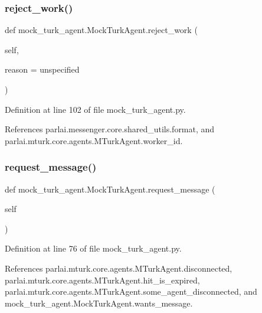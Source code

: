 \subsubsection{\texorpdfstring{reject\+\_\+work()}{reject\_work()}}
{\footnotesize\ttfamily def mock\+\_\+turk\+\_\+agent.\+Mock\+Turk\+Agent.\+reject\+\_\+work (\begin{DoxyParamCaption}\item[{}]{self,  }\item[{}]{reason = {\ttfamily \textquotesingle{}unspecified\textquotesingle{}} }\end{DoxyParamCaption})}



Definition at line 102 of file mock\+\_\+turk\+\_\+agent.\+py.



References parlai.\+messenger.\+core.\+shared\+\_\+utils.\+format, and parlai.\+mturk.\+core.\+agents.\+M\+Turk\+Agent.\+worker\+\_\+id.

\mbox{\label{classmock__turk__agent_1_1MockTurkAgent_a2083b9c54bdccab9318ad8a08ab554ac}} 
\subsubsection{\texorpdfstring{request\+\_\+message()}{request\_message()}}
{\footnotesize\ttfamily def mock\+\_\+turk\+\_\+agent.\+Mock\+Turk\+Agent.\+request\+\_\+message (\begin{DoxyParamCaption}\item[{}]{self }\end{DoxyParamCaption})}



Definition at line 76 of file mock\+\_\+turk\+\_\+agent.\+py.



References parlai.\+mturk.\+core.\+agents.\+M\+Turk\+Agent.\+disconnected, parlai.\+mturk.\+core.\+agents.\+M\+Turk\+Agent.\+hit\+\_\+is\+\_\+expired, parlai.\+mturk.\+core.\+agents.\+M\+Turk\+Agent.\+some\+\_\+agent\+\_\+disconnected, and mock\+\_\+turk\+\_\+agent.\+Mock\+Turk\+Agent.\+wants\+\_\+message.

